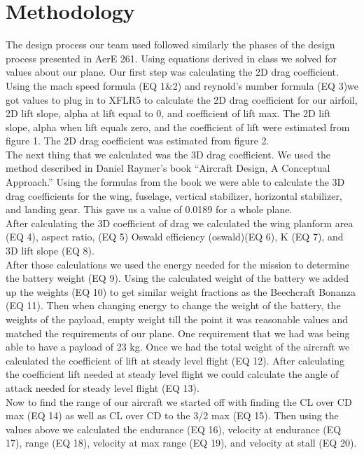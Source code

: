 \documentclass[12pt,A4paper]{article}
\begin{document}
	\clearpage
	\section{Methodology}
	\indent The design process our team used followed similarly the phases of the design process presented in AerE 261. Using equations derived in class we solved for values about our plane. Our first step was calculating the 2D drag coefficient. Using the mach speed formula (EQ 1\&2) and reynold's number formula (EQ 3)we got values to plug in to XFLR5 to calculate the 2D drag coefficient for our airfoil, 2D lift slope, alpha at lift equal to 0, and coefficient of lift max. The 2D lift slope, alpha when lift equals zero, and the coefficient of lift were estimated from figure 1. The 2D drag coefficient was estimated from figure 2. \\
	\indent The next thing that we calculated was the 3D drag coefficient. We used the method described in Daniel Raymer's book “Aircraft Design, A Conceptual Approach.” Using the formulas from the book we were able to calculate the 3D drag coefficients for the wing, fuselage, vertical stabilizer, horizontal stabilizer, and landing gear. This gave us a value of 0.0189 for a whole plane. \\
	\indent After calculating the 3D coefficient of drag we calculated the wing planform area (EQ 4), aspect ratio, (EQ 5) Oswald efficiency (oswald)(EQ 6), K (EQ 7), and 3D lift slope (EQ 8).\\
	\indent After those calculations we used the energy needed for the mission to determine the battery weight (EQ 9). Using the calculated weight of the battery we added up the weights (EQ 10) to get similar weight fractions as the Beechcraft Bonanza (EQ 11). Then when changing energy to change the weight of the battery, the weights of the payload, empty weight till the point it was reasonable values and matched the requirements of our plane. One requirement that we had was being able to have a payload of 23 kg. Once we had the total weight of the aircraft we calculated the coefficient of lift at steady level flight (EQ 12). After calculating the coefficient lift needed at steady level flight we could calculate the angle of attack needed for steady level flight (EQ 13). \\
	\indent Now to find the range of our aircraft we started off with finding the CL over CD max (EQ 14) as well as CL over CD to the 3/2 max (EQ 15). Then using the values above we calculated the endurance (EQ 16), velocity at endurance (EQ 17), range (EQ 18), velocity at max range (EQ 19), and velocity at stall (EQ 20). \\
\end{document}
